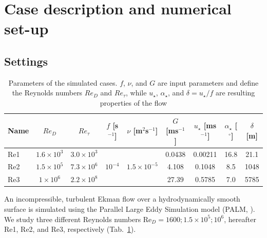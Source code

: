 \documentclass[smallcondensed,draft]{svjour3}
\begin{document}
\section{Case description and numerical set-up}
\label{setup}

\subsection{Settings}

\begin{table}
	\centering
	\caption{Parameters of the simulated cases. $f$, $\nu$, and $G$ are input parameters and define the Reynolds numbers $Re_D$ and $Re_\tau$, while $u_\star$, $\alpha_\star$, and $\delta = u_\star/f$ are resulting properties of the flow}
	\begin{adjustbox}{width=\textwidth}
    \begin{tabular}{l|ccccc|ccc}
          \toprule
	  Name & $Re_D$ & $Re_\tau$ & $f$ [s$^{-1}$] & $\nu$ [m$^2$s$^{-1}$] & $G$ [ms$^{-1}$] & $u_\star$ [ms$^{-1}$] & $\alpha_\star$ [$^\circ$]& $\delta$ [m] \\
          \midrule
	  Re1 & $1.6\times10^3$ & $3.0\times10^3$ &  &  & 0.0438 & 0.00211 & 16.8 & 21.1 \\
	  Re2 & $1.5\times10^5$ & $7.3\times10^6$ & $10^{-4}$ & $1.5\times10^{-5}$ & 4.108 & 0.1048 & 8.5 & 1048\\
	  Re3 & $1\times10^6$ & $2.2\times10^8$ &  &  & 27.39 & 0.5785 & 7.0 & 5785 \\
          \bottomrule
	  \end{tabular}
  \end{adjustbox}
	\label{simulation_parameters}
\end{table}
An incompressible, turbulent Ekman flow over a hydrodynamically smooth surface is simulated using the Parallel Large Eddy Simulation model (PALM, \citealp{maronga2020overview}). We study three different Reynolds numbers Re$_D = 1600;1.5\times 10^5;10^6$, hereafter Re1, Re2, and Re3, respectively (Tab.~\ref{simulation_parameters}).
%
\end{document}
